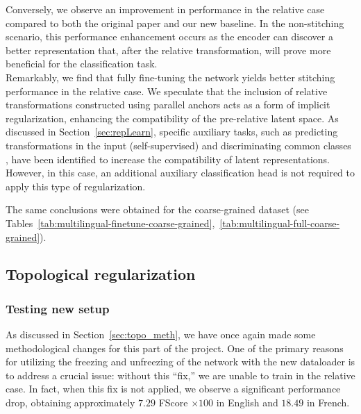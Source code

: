\documentclass[../main.tex]{subfiles}
\begin{document}
Conversely, we observe an improvement in performance in the relative case compared to both the original paper and our new baseline. In the non-stitching scenario, this performance enhancement occurs as the encoder can discover a better representation that, after the relative transformation, will prove more beneficial for the classification task.\\

Remarkably, we find that fully fine-tuning the network yields better stitching performance in the relative case. We speculate that the inclusion of relative transformations constructed using parallel anchors acts as a form of implicit regularization, enhancing the compatibility of the pre-relative latent space. As discussed in Section~\ref{sec:repLearn}, specific auxiliary tasks, such as predicting transformations in the input (self-supervised) and discriminating common classes \cite{gygli_towards_2020}, have been identified to increase the compatibility of latent representations. However, in this case, an additional auxiliary classification head is not required to apply this type of regularization.

\begin{mathNote}
The same conclusions were obtained for the coarse-grained dataset (see Tables~\ref{tab:multilingual-finetune-coarse-grained},~\ref{tab:multilingual-full-coarse-grained}).
\end{mathNote}

\subsection{Topological regularization}
\label{sec:res_topo}
\subsubsection*{Testing new setup}

As discussed in Section~\ref{sec:topo_meth}, we have once again made some methodological changes for this part of the project. One of the primary reasons for utilizing the freezing and unfreezing of the network with the new dataloader is to address a crucial issue: without this ``fix,'' we are unable to train in the relative case. In fact, when this fix is not applied, we observe a significant performance drop, obtaining approximately $7.29$ FScore $\times 100$ in English and $18.49$ in French.\\
\end{document}
